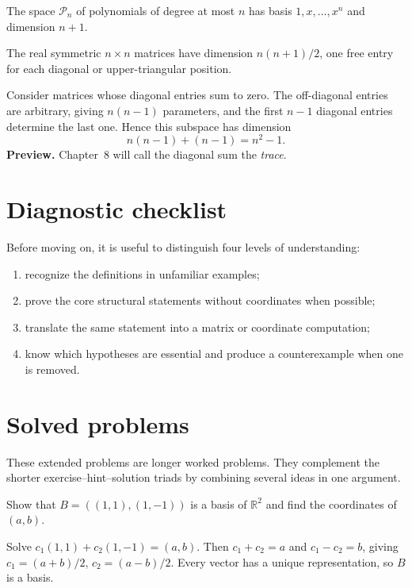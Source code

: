 \begin{example}\label{ex:i03-worked-01}
The space $\mathcal P_n$ of polynomials of degree at most $n$ has basis $1,x,\ldots,x^n$ and dimension $n+1$.
\end{example}

\begin{example}\label{ex:i03-worked-02}
The real symmetric $n\times n$ matrices have dimension $n(n+1)/2$, one free entry for each diagonal or upper-triangular position.
\end{example}

\begin{example}\label{ex:i03-worked-03}
Consider matrices whose diagonal entries sum to zero. The off-diagonal entries are arbitrary, giving $n(n-1)$ parameters, and the first $n-1$ diagonal entries determine the last one. Hence this subspace has dimension
\[
n(n-1)+(n-1)=n^2-1.
\]
\textbf{Preview.} Chapter~8 will call the diagonal sum the \emph{trace}.
\end{example}

\section{Diagnostic checklist}
Before moving on, it is useful to distinguish four levels of understanding:
\begin{enumerate}
\item recognize the definitions in unfamiliar examples;
\item prove the core structural statements without coordinates when possible;
\item translate the same statement into a matrix or coordinate computation;
\item know which hypotheses are essential and produce a counterexample when one is removed.
\end{enumerate}

\section{Solved problems}
These extended problems are longer worked problems. They complement the shorter exercise--hint--solution triads by combining several ideas in one argument.

\begin{problem}\label{prob:i03-problem-01}
Show that $B=((1,1),(1,-1))$ is a basis of $\mathbb R^2$ and find the coordinates of $(a,b)$.
\end{problem}
\begin{solution}
Solve $c_1(1,1)+c_2(1,-1)=(a,b)$. Then $c_1+c_2=a$ and $c_1-c_2=b$, giving $c_1=(a+b)/2$, $c_2=(a-b)/2$. Every vector has a unique representation, so $B$ is a basis.
\end{solution}

